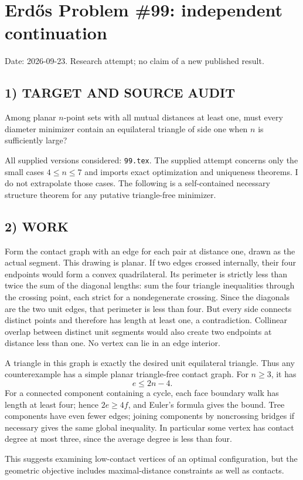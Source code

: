 \section{Erd\H{o}s Problem \#99: independent continuation}
\noindent Date: 2026-09-23. Research attempt; no claim of a new published result.
\subsection{1) TARGET AND SOURCE AUDIT}
Among planar $n$-point sets with all mutual distances at least one, must every diameter minimizer contain an equilateral triangle of side one when $n$ is sufficiently large?

All supplied versions considered: \texttt{99.tex}.
The supplied attempt concerns only the small cases $4\le n\le7$ and imports exact optimization and uniqueness theorems. I do not extrapolate those cases. The following is a self-contained necessary structure theorem for any putative triangle-free minimizer.
\subsection{2) WORK}
Form the contact graph with an edge for each pair at distance one, drawn as the actual segment. This drawing is planar. If two edges crossed internally, their four endpoints would form a convex quadrilateral. Its perimeter is strictly less than twice the sum of the diagonal lengths: sum the four triangle inequalities through the crossing point, each strict for a nondegenerate crossing. Since the diagonals are the two unit edges, that perimeter is less than four. But every side connects distinct points and therefore has length at least one, a contradiction. Collinear overlap between distinct unit segments would also create two endpoints at distance less than one. No vertex can lie in an edge interior.

A triangle in this graph is exactly the desired unit equilateral triangle. Thus any counterexample has a simple planar triangle-free contact graph. For $n\ge3$, it has
\[
e\le2n-4.
\]
For a connected component containing a cycle, each face boundary walk has length at least four; hence $2e\ge4f$, and Euler's formula gives the bound. Tree components have even fewer edges; joining components by noncrossing bridges if necessary gives the same global inequality. In particular some vertex has contact degree at most three, since the average degree is less than four.

This suggests examining low-contact vertices of an optimal configuration, but the geometric objective includes maximal-distance constraints as well as contacts.
